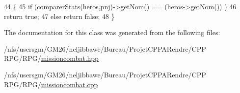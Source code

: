 \begin{DoxyCode}
44                                                          \{
45       \textcolor{keywordflow}{if} (\hyperlink{class_mission_combat_a511ab55d291861d8c000fcba73393f44}{comparerStats}(heros,pnj)->getNom() == (heros->\hyperlink{class_personnage_a519301399a9bee1557858aa50a04a85a}{getNom}()) )
46         \textcolor{keywordflow}{return} \textcolor{keyword}{true};
47       \textcolor{keywordflow}{else} \textcolor{keywordflow}{return} \textcolor{keyword}{false};
48   \}
\end{DoxyCode}


The documentation for this class was generated from the following files\-:\begin{DoxyCompactItemize}
\item 
/nfs/usersgm/\-G\-M26/neljibbawe/\-Bureau/\-Projet\-C\-P\-P\-A\-Rendre/\-C\-P\-P R\-P\-G/\-R\-P\-G/\hyperlink{missioncombat_8hpp}{missioncombat.\-hpp}\item 
/nfs/usersgm/\-G\-M26/neljibbawe/\-Bureau/\-Projet\-C\-P\-P\-A\-Rendre/\-C\-P\-P R\-P\-G/\-R\-P\-G/\hyperlink{missioncombat_8cpp}{missioncombat.\-cpp}\end{DoxyCompactItemize}
